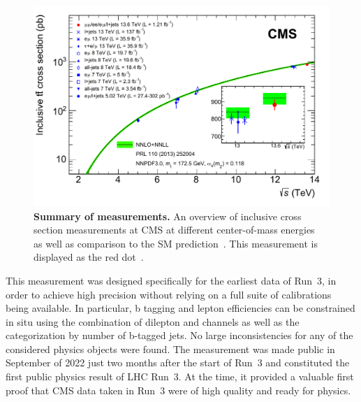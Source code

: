\begin{figure}[!t]
    \centering
    \includegraphics[width=0.8\linewidth]{figures/ttxs/tt_curve.pdf}
    \caption{\textbf{Summary of \sigmatt measurements.} An overview of inclusive \ttbar cross section measurements at CMS at different center-of-mass energies~\cite{CMS:TOP-11-007, CMS:TOP-14-018, CMS:TOP-12-006, CMS:TOP-13-004, CMS:TOP-17-001, CMS:TOP-18-005, CMS:TOP-20-001, CMS:TOP-20-004} as well as comparison to the SM prediction~\cite{Czakon:2013goa}. This measurement is displayed as the red dot~\cite{CMS:TOP-22-012}.}
    \label{fig:ttxs:ttcurve}
\end{figure}

This measurement was designed specifically for the earliest data of Run~3, in order to achieve high precision without relying on a full suite of calibrations being available. In particular, b tagging and lepton efficiencies can be constrained in situ using the combination of dilepton and \ljets channels as well as the categorization by number of b-tagged jets. No large inconsistencies for any of the considered physics objects were found. The measurement was made public in September of 2022 just two months after the start of Run~3 and constituted the first public physics result of LHC Run~3. At the time, it provided a valuable first proof that CMS data taken in Run~3 were of high quality and ready for physics.

